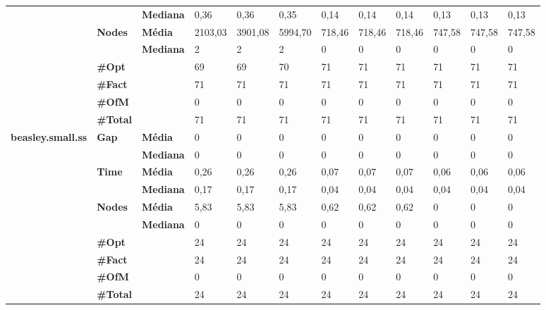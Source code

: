 \documentclass[]{article}
\begin{document}
\begin{table}[]
\begin{adjustbox}{angle=90}
\begin{tabular}{cll|lll|lll|lll}
				& & \textbf{Mediana} & 0,36 & 0,36 & 0,35 & 0,14 & 0,14 & 0,14 & 0,13 & 0,13 & 0,13 \\
				\cline{2-12}
				& \multirow{2}{*}{\textbf{Nodes}} & \textbf{Média} & 2103,03 & 3901,08 & 5994,70 & 718,46 & 718,46 & 718,46 & 747,58 & 747,58 & 747,58 \\
				& & \textbf{Mediana} & 2 & 2 & 2 & 0 & 0 & 0 & 0 & 0 & 0 \\
				\cline{2-12}
				& \textbf{\#Opt} & & 69 & 69 & 70 & 71 & 71 & 71 & 71 & 71 & 71 \\
				& \textbf{\#Fact} & & 71 & 71 & 71 & 71 & 71 & 71 & 71 & 71 & 71 \\
				& \textbf{\#OfM} & & 0 & 0 & 0 & 0 & 0 & 0 & 0 & 0 & 0 \\
				& \textbf{\#Total} & & 71 & 71 & 71 & 71 & 71 & 71 & 71 & 71 & 71 \\
				\hline
				\multirow{7}{*}{\textbf{beasley.small.ss}} & \multirow{2}{*}{\textbf{Gap}} & \textbf{Média} & 0 & 0 & 0 & 0 & 0 & 0 & 0 & 0 & 0 \\
				& & \textbf{Mediana} & 0 & 0 & 0 & 0 & 0 & 0 & 0 & 0 & 0 \\
				\cline{2-12}
				& \multirow{2}{*}{\textbf{Time}} & \textbf{Média} & 0,26 & 0,26 & 0,26 & 0,07 & 0,07 & 0,07 & 0,06 & 0,06 & 0,06 \\
				& & \textbf{Mediana} & 0,17 & 0,17 & 0,17 & 0,04 & 0,04 & 0,04 & 0,04 & 0,04 & 0,04 \\
				\cline{2-12}
				& \multirow{2}{*}{\textbf{Nodes}} & \textbf{Média} & 5,83 & 5,83 & 5,83 & 0,62 & 0,62 & 0,62 & 0 & 0 & 0 \\
				& & \textbf{Mediana} & 0 & 0 & 0 & 0 & 0 & 0 & 0 & 0 & 0 \\
				\cline{2-12}
				& \textbf{\#Opt} & & 24 & 24 & 24 & 24 & 24 & 24 & 24 & 24 & 24 \\
				& \textbf{\#Fact} & & 24 & 24 & 24 & 24 & 24 & 24 & 24 & 24 & 24 \\
				& \textbf{\#OfM} & & 0 & 0 & 0 & 0 & 0 & 0 & 0 & 0 & 0 \\
				& \textbf{\#Total} & & 24 & 24 & 24 & 24 & 24 & 24 & 24 & 24 & 24 \\
			\end{tabular}
		\end{adjustbox}
	\end{table}
	
\end{document}
